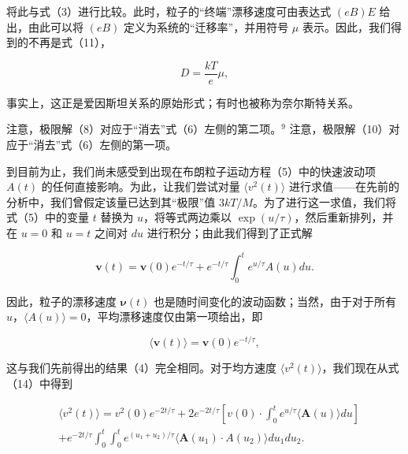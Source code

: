 将此与式（3）进行比较。此时，粒子的``终端''漂移速度可由表达式 \((eB)E\) 给出，由此可以将 \((eB)\) 定义为系统的``迁移率''，并用符号 \(\mu\) 表示。因此，我们得到的不再是式（11），

\begin{equation}\tag{15.3.13}\label{eq:15.3.13}
D = \frac { k T } { e } \mu ,
\end{equation}

事实上，这正是爱因斯坦关系的原始形式；有时也被称为奈尔斯特关系。

注意，极限解（8）对应于``消去''式（6）左侧的第二项。\(^{9}\) 注意，极限解（10）对应于``消去''式（6）左侧的第一项。

到目前为止，我们尚未感受到出现在布朗粒子运动方程（5）中的快速波动项 \(A(t)\) 的任何直接影响。为此，让我们尝试对量 \(\langle v^{2}(t)\rangle\) 进行求值------在先前的分析中，我们曾假定该量已达到其``极限''值 \(3kT/M\)。为了进行这一求值，我们将式（5）中的变量 \(t\) 替换为 \(u\)，将等式两边乘以 \(\exp(u/\tau)\)，然后重新排列，并在 \(u=0\) 和 \(u=t\) 之间对 \(du\) 进行积分；由此我们得到了正式解

\begin{equation}\tag{15.3.14}\label{eq:15.3.14}
\pmb { v } ( t ) = \pmb { v } ( 0 ) e ^{- t / \tau} + e ^{- t / \tau} \int _ { 0 } ^{t} e ^{u / \tau} A ( u ) d u .
\end{equation}

因此，粒子的漂移速度 \(\boldsymbol{\nu}(t)\) 也是随时间变化的波动函数；当然，由于对于所有 \(u\)，\(\langle A(u)\rangle=0\)，平均漂移速度仅由第一项给出，即

\begin{equation}\tag{15.3.15}\label{eq:15.3.15}
\langle \boldsymbol { v } ( t ) \rangle = \boldsymbol { v } ( 0 ) e ^{- t / \tau} ,
\end{equation}

这与我们先前得出的结果（4）完全相同。对于均方速度 \(\langle v^{2}(t)\rangle\)，我们现在从式（14）中得到

\begin{equation}\tag{15.3.16}\label{eq:15.3.16}
\begin{array}{rl} & { \langle v ^{2} ( t ) \rangle = v ^{2} ( 0 ) e ^{- 2 t / \tau} + 2 e ^{- 2 t / \tau} \left[ v ( 0 ) \cdot \int _ { 0 } ^{t} e ^{u / \tau} \langle \mathbf { A } ( u ) \rangle d u \right] } \\& {  + e ^{- 2 t / \tau} \int _ { 0 } ^{t} \int _ { 0 } ^{t} e ^{( u _ { 1} + u _ { 2 } ) / \tau } \langle \mathbf { A } ( u _ { 1 } ) \cdot A ( u _ { 2 } ) \rangle d u _ { 1 } d u _ { 2 } . } \end{array}
\end{equation}

